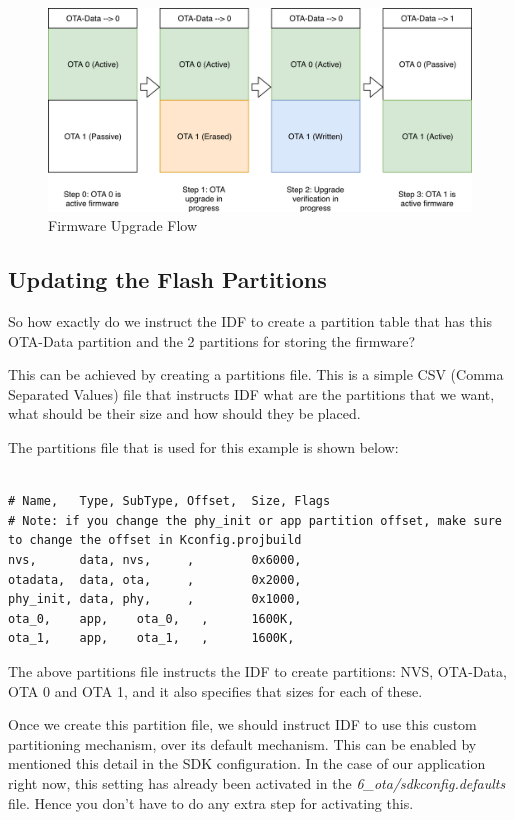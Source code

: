 \documentclass[main.tex]{subfiles}
\begin{document}
\begin{figure}[h!]
    \centering
    \includegraphics[scale=0.4]{../../_static/upgrade_flow.png}
    \caption{Firmware Upgrade Flow}
    \label{fig:ota_workflow}
\end{figure}

\subsection{Updating the Flash Partitions}\label{sec:updating_flash_partitions}
So how exactly do we instruct the IDF to create a partition table that has this OTA-Data partition and the 2 partitions for storing the firmware?

This can be achieved by creating a partitions file. This is a simple CSV (Comma Separated Values) file that instructs IDF what are the partitions that we want, what should be their size and how should they be placed.

The partitions file that is used for this example is shown below:
\begin{verbatim}

# Name,   Type, SubType, Offset,  Size, Flags
# Note: if you change the phy_init or app partition offset, make sure to change the offset in Kconfig.projbuild
nvs,      data, nvs,     ,        0x6000,
otadata,  data, ota,     ,        0x2000,
phy_init, data, phy,     ,        0x1000,
ota_0,    app,    ota_0,   ,      1600K,
ota_1,    app,    ota_1,   ,      1600K,
\end{verbatim}

The above partitions file instructs the IDF to create partitions: NVS, OTA-Data, OTA 0 and OTA 1, and it also specifies that sizes for each of these.

Once we create this partition file, we should instruct IDF to use this custom partitioning mechanism, over its default mechanism. This can be enabled by mentioned this detail in the SDK configuration. In the case of our application right now, this setting has already been activated in the \textit{6\_ota/sdkconfig.defaults} file. Hence you don't have to do any extra step for activating this.
\end{document}
